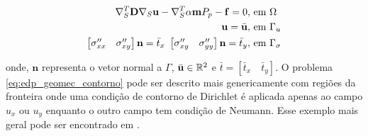 \begin{equation} \label{eq:edp_geomec_contorno}
\begin{aligned}
     \nabla_S^T \mathbf{D} \nabla_S \mathbf{u} - \nabla_S^T\alpha \mathbf{m} P_p - \mathbf{f} = 0, & \text{ em }\Omega  \\
     \mathbf{u} = \bar{\mathbf{u}},& \text{ em } \Gamma_u \\
    \begin{bmatrix}
        \sigma_{xx}^{\prime\prime} & \sigma_{xy}^{\prime\prime}
    \end{bmatrix} \mathbf{n} = \bar{t}_x \text{   }     \begin{bmatrix}
        \sigma_{xy}^{\prime\prime} & \sigma_{yy}^{\prime\prime}
    \end{bmatrix} \mathbf{n} = \bar{t}_y, & \text{   em } \Gamma_{\sigma} 
\end{aligned}  
\end{equation}

onde, $\mathbf{n}$ representa o vetor normal a $\Gamma$, $\bar{\mathbf{u}} \in \mathbb{R}^2$ e $\bar{t} = [ \bar{t}_x \quad \bar{t}_y ]$. O problema \eqref{eq:edp_geomec_contorno} pode ser descrito mais genericamente com regiões da fronteira onde uma condição de contorno de Dirichlet é aplicada apenas ao campo $u_x$ ou $u_y$ enquanto o outro campo tem condição de Neumann. Esse exemplo mais geral pode ser encontrado em \citet{hughes}.
